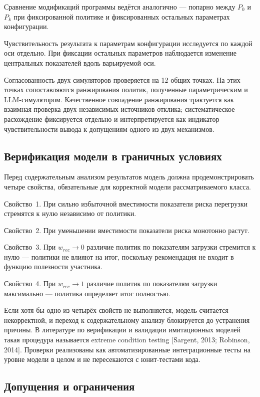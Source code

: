 Сравнение модификаций программы ведётся аналогично --- попарно между $P_0$ и $P_k$ при фиксированной политике и фиксированных остальных параметрах конфигурации.

Чувствительность результата к параметрам конфигурации исследуется по каждой оси отдельно. При фиксации остальных параметров наблюдается изменение центральных показателей вдоль варьируемой оси.

Согласованность двух симуляторов проверяется на 12 общих точках. На этих точках сопоставляются ранжирования политик, полученные параметрическим и LLM-симулятором. Качественное совпадение ранжирования трактуется как взаимная проверка двух независимых источников отклика; систематическое расхождение фиксируется отдельно и интерпретируется как индикатор чувствительности вывода к допущениям одного из двух механизмов.


\subsection{Верификация модели в граничных условиях}

Перед содержательным анализом результатов модель должна продемонстрировать четыре свойства, обязательные для корректной модели рассматриваемого класса.

Свойство~1. При сильно избыточной вместимости показатели риска перегрузки стремятся к нулю независимо от политики.

Свойство~2. При уменьшении вместимости показатели риска монотонно растут.

Свойство~3. При $w_{rec} \to 0$ различие политик по показателям загрузки стремится к нулю --- политики не влияют на итог, поскольку рекомендация не входит в функцию полезности участника.

Свойство~4. При $w_{rec} \to 1$ различие политик по показателям загрузки максимально --- политика определяет итог полностью.

Если хотя бы одно из четырёх свойств не выполняется, модель считается некорректной, и переход к содержательному анализу блокируется до устранения причины. В литературе по верификации и валидации имитационных моделей такая процедура называется extreme condition testing [Sargent, 2013; Robinson, 2014]. Проверки реализованы как автоматизированные интеграционные тесты на уровне модели в целом и не пересекаются с юнит-тестами кода.


\subsection{Допущения и ограничения}

